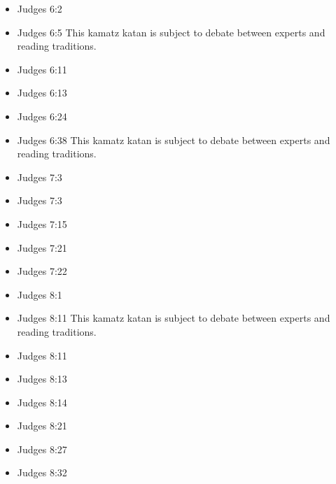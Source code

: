\documentclass[14pt]{article}
\begin{document}
\begin{multicols}{2}
\begin{itemize}
			\item Judges 6:2
			
			\item Judges 6:5 This kamatz katan is subject to debate between experts and reading traditions.
			
			\item Judges 6:11
			
			\item Judges 6:13
			
			\item Judges 6:24
			
			\item Judges 6:38 This kamatz katan is subject to debate between experts and reading traditions.
			
			\item Judges 7:3
			
			\item Judges 7:3
			
			\item Judges 7:15
			
			\item Judges 7:21
			
			\item Judges 7:22
			
			\item Judges 8:1
			
			\item Judges 8:11 This kamatz katan is subject to debate between experts and reading traditions.
			
			\item Judges 8:11
			
			\item Judges 8:13
			
			\item Judges 8:14
			
			\item Judges 8:21
			
			\item Judges 8:27
			
			\item Judges 8:32
			

\end{itemize}
\end{multicols}
\end{document}
